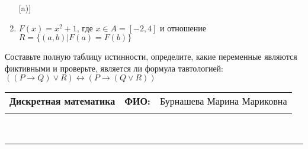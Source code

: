 \documentclass[10pt]{exam}
\newcommand{\class}{Дискретная математика}
\newcommand{\examdate}{}
\begin{document}
\begin{questions}
\begin{enumerate} [a)]
\item $F(x)=x^{2}+1$, где $x \in A = [-2, 4]$ и отношение $R = \{(a,b)|F(a) = F(b)\}$
\end{enumerate}\question Составьте полную таблицу истинности, определите, какие переменные являются фиктивными и проверьте, является ли формула тавтологией:
$((P \rightarrow Q) \lor R) \leftrightarrow (P \rightarrow (Q \lor R))$

\end{questions}
\newpage
\begin{flushright}
\begin{tabular}{p{2.8in} r l}
\textbf{\class} & \textbf{ФИО:} &Бурнашева Марина Мариковна
\\

\textbf{\examdate} &&\\
\end{tabular}\\
\end{flushright}
\rule[1ex]{\textwidth}{.1pt}
\end{document}

